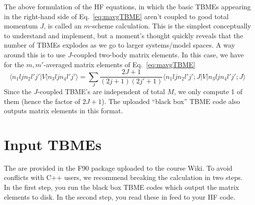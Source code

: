 \documentclass[letterpaper,12pt]{article}
\begin{document}
The above formulation of the HF equations, in which the basic TBMEs appearing in the right-hand side of Eq.~\ref{eq:mavgTBME} aren't coupled to good total momentum $J$, is called an $m$-scheme calculation. This is the simplest conceptually to understand and implement, but a moment's thought quickly reveals that the number of TBMEs explodes as we go to larger systems/model spaces. A way around this is to use $J$-coupled two-body matrix elements. In this case, we have for the $m,m'$-averaged matrix elements of Eq.~\ref{eq:mavgTBME}
\begin{equation}
\langle n_1ljn_2l'j'|V|n_3ljn_4l'j'\rangle = \sum_J \frac{2J+1}{(2j+1)(2j'+1)} \langle n_1ljn_2l'j';J|V|n_3ljn_4l'j';J\rangle
\end{equation}
Since the $J$-coupled TBME's are independent of total $M$, we only compute 1 of them (hence the factor of $2J+1$). The uploaded ``black box'' TBME code also outputs matrix elements in this format. 


\section{Input TBMEs}

The are provided in the F90 package uploaded to the course Wiki. To avoid conflicts with C++ users, we recommend breaking the calculation in two steps. In the first step, you run the black box TBME codes which output the matrix elements to disk.  In the second step, you read these in feed to your HF code. 
\end{document}
